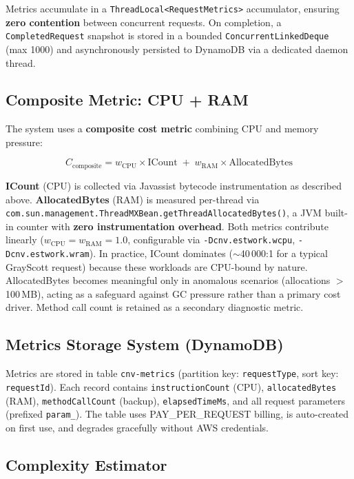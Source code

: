 \documentclass[10pt,twocolumn]{article}
\begin{document}
Metrics accumulate in a \texttt{ThreadLocal<RequestMetrics>} accumulator, ensuring \textbf{zero contention} between concurrent requests. On completion, a \texttt{CompletedRequest} snapshot is stored in a bounded \texttt{ConcurrentLinkedDeque} (max 1000) and asynchronously persisted to DynamoDB via a dedicated daemon thread.

\subsection{Composite Metric: CPU + RAM}

The system uses a \textbf{composite cost metric} combining CPU and memory pressure:

\[
C_{\text{composite}} = w_{\text{CPU}} \times \text{ICount} \;+\; w_{\text{RAM}} \times \text{AllocatedBytes}
\]

\textbf{ICount} (CPU) is collected via Javassist bytecode instrumentation as described above. \textbf{AllocatedBytes} (RAM) is measured per-thread via \texttt{com.sun.management.ThreadMXBean.getThreadAllocatedBytes()}, a JVM built-in counter with \textbf{zero instrumentation overhead}. Both metrics contribute linearly ($w_{\text{CPU}}\!=\!w_{\text{RAM}}\!=\!1.0$, configurable via \texttt{-Dcnv.estwork.wcpu}, \texttt{-Dcnv.estwork.wram}). In practice, ICount dominates ($\sim$40\,000:1 for a typical GrayScott request) because these workloads are CPU-bound by nature. AllocatedBytes becomes meaningful only in anomalous scenarios (allocations $>$100\,MB), acting as a safeguard against GC pressure rather than a primary cost driver. Method call count is retained as a secondary diagnostic metric.

\subsection{Metrics Storage System (DynamoDB)}

Metrics are stored in table \texttt{cnv-metrics} (partition key: \texttt{requestType}, sort key: \texttt{requestId}). Each record contains \texttt{instructionCount} (CPU), \texttt{allocatedBytes} (RAM), \texttt{methodCallCount} (backup), \texttt{elapsedTimeMs}, and all request parameters (prefixed \texttt{param\_}). The table uses PAY\_PER\_REQUEST billing, is auto-created on first use, and degrades gracefully without AWS credentials.

\subsection{Complexity Estimator}
\end{document}
